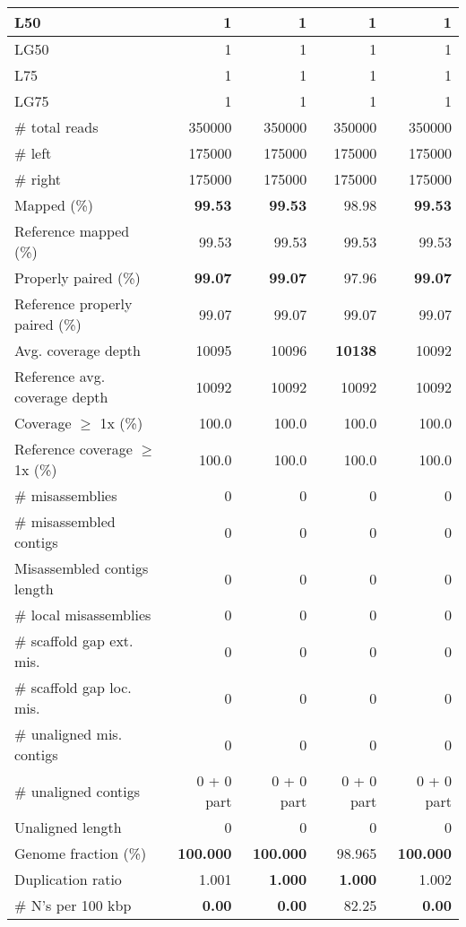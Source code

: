 \documentclass[12pt,a4paper]{article}
\begin{document}
\begin{table}[ht]
\begin{center}
\begin{tabular}{|l*{4}{|r}|}
L50 & 1 & 1 & 1 & 1 \\ \hline
LG50 & 1 & 1 & 1 & 1 \\ \hline
L75 & 1 & 1 & 1 & 1 \\ \hline
LG75 & 1 & 1 & 1 & 1 \\ \hline
\# total reads & 350000 & 350000 & 350000 & 350000 \\ \hline
\# left & 175000 & 175000 & 175000 & 175000 \\ \hline
\# right & 175000 & 175000 & 175000 & 175000 \\ \hline
Mapped (\%) & {\bf 99.53} & {\bf 99.53} & 98.98 & {\bf 99.53} \\ \hline
Reference mapped (\%) & 99.53 & 99.53 & 99.53 & 99.53 \\ \hline
Properly paired (\%) & {\bf 99.07} & {\bf 99.07} & 97.96 & {\bf 99.07} \\ \hline
Reference properly paired (\%) & 99.07 & 99.07 & 99.07 & 99.07 \\ \hline
Avg. coverage depth & 10095 & 10096 & {\bf 10138} & 10092 \\ \hline
Reference avg. coverage depth & 10092 & 10092 & 10092 & 10092 \\ \hline
Coverage $\geq$ 1x (\%) & 100.0 & 100.0 & 100.0 & 100.0 \\ \hline
Reference coverage $\geq$ 1x (\%) & 100.0 & 100.0 & 100.0 & 100.0 \\ \hline
\# misassemblies & 0 & 0 & 0 & 0 \\ \hline
\# misassembled contigs & 0 & 0 & 0 & 0 \\ \hline
Misassembled contigs length & 0 & 0 & 0 & 0 \\ \hline
\# local misassemblies & 0 & 0 & 0 & 0 \\ \hline
\# scaffold gap ext. mis. & 0 & 0 & 0 & 0 \\ \hline
\# scaffold gap loc. mis. & 0 & 0 & 0 & 0 \\ \hline
\# unaligned mis. contigs & 0 & 0 & 0 & 0 \\ \hline
\# unaligned contigs & 0 + 0 part & 0 + 0 part & 0 + 0 part & 0 + 0 part \\ \hline
Unaligned length & 0 & 0 & 0 & 0 \\ \hline
Genome fraction (\%) & {\bf 100.000} & {\bf 100.000} & 98.965 & {\bf 100.000} \\ \hline
Duplication ratio & 1.001 & {\bf 1.000} & {\bf 1.000} & 1.002 \\ \hline
\# N's per 100 kbp & {\bf 0.00} & {\bf 0.00} & 82.25 & {\bf 0.00} \\ \hline

\end{tabular}
\end{center}
\end{table}
\end{document}
